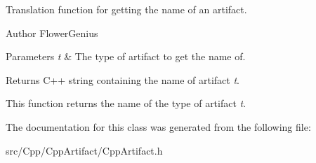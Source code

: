 Translation function for getting the name of an artifact. 

\begin{DoxyAuthor}{Author}
Flower\+Genius 
\end{DoxyAuthor}

\begin{DoxyParams}{Parameters}
{\em t} & The type of artifact to get the name of. \\
\hline
\end{DoxyParams}
\begin{DoxyReturn}{Returns}
C++ string containing the name of artifact {\itshape t}.
\end{DoxyReturn}
This function returns the name of the type of artifact {\itshape t}. 

The documentation for this class was generated from the following file\+:\begin{DoxyCompactItemize}
\item 
src/\+Cpp/\+Cpp\+Artifact/Cpp\+Artifact.\+h\end{DoxyCompactItemize}
